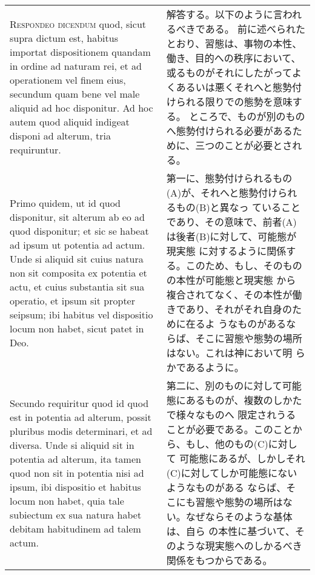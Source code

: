 \documentclass[10pt]{jsarticle} %
\begin{document}
\begin{longtable}{p{21em}p{21em}}
\\



{\scshape Respondeo dicendum} quod, sicut supra dictum est, habitus importat
dispositionem quandam in ordine ad naturam rei, et ad operationem vel
finem eius, secundum quam bene vel male aliquid ad hoc disponitur. Ad
hoc autem quod aliquid indigeat disponi ad alterum, tria
requiruntur. 

&

解答する。以下のように言われるべきである。
前に述べられたとおり、習態は、事物の本性、働き、目的への秩序において、或るものがそれにしたがってよくあるいは悪くそれへと態勢付けられる限りでの態勢を意味する。
ところで、ものが別のものへ態勢付けられる必要があるために、三つのことが必要とされる。

\\

Primo quidem, ut id quod disponitur, sit alterum ab eo ad
quod disponitur; et sic se habeat ad ipsum ut potentia ad actum. Unde
si aliquid sit cuius natura non sit composita ex potentia et actu, et
cuius substantia sit sua operatio, et ipsum sit propter seipsum; ibi
habitus vel dispositio locum non habet, sicut patet in Deo. 

&

第一に、態勢付けられるもの(A)が、それへと態勢付けられるもの(B)と異なっ
ていることであり、その意味で、前者(A)は後者(B)に対して、可能態が現実態
に対するように関係する。このため、もし、そのものの本性が可能態と現実態
から複合されてなく、その本性が働きであり、それがそれ自身のために在るよ
うなものがあるならば、そこに習態や態勢の場所はない。これは神において明
らかであるように。

\\


Secundo
requiritur quod id quod est in potentia ad alterum, possit pluribus
modis determinari, et ad diversa. Unde si aliquid sit in potentia ad
alterum, ita tamen quod non sit in potentia nisi ad ipsum, ibi
dispositio et habitus locum non habet, quia tale subiectum ex sua
natura habet debitam habitudinem ad talem actum. 

&

第二に、別のものに対して可能態にあるものが、複数のしかたで様々なものへ
限定されうることが必要である。このことから、もし、他のもの(C)に対して
可能態にあるが、しかしそれ(C)に対してしか可能態にないようなものがある
ならば、そこにも習態や態勢の場所はない。なぜならそのような基体は、自ら
の本性に基づいて、そのような現実態へのしかるべき関係をもつからである。



\end{longtable}
\end{document}
